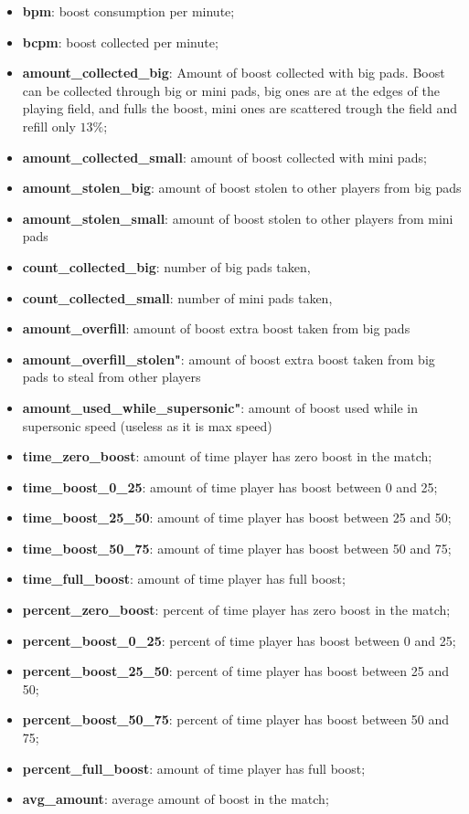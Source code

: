 \begin{itemize}
    \item \textbf{bpm}: boost consumption per minute;
    \item \textbf{bcpm}: boost collected per minute;
    \item \textbf{amount\_collected\_big}: Amount of boost collected with big pads. Boost can be collected through big or mini pads, big ones are at the edges of the playing field, and fulls the boost, mini ones are scattered trough the field and refill only $13 \%$;
    \item \textbf{amount\_collected\_small}: amount of boost collected with mini pads;
    \item \textbf{amount\_stolen\_big}: amount of boost stolen to other players from big pads
    \item \textbf{amount\_stolen\_small}: amount of boost stolen to other players from mini pads
    \item \textbf{count\_collected\_big}: number of big pads taken,
    \item \textbf{count\_collected\_small}: number of mini pads taken,
    \item \textbf{amount\_overfill}: amount of boost extra boost taken from big pads
    \item \textbf{amount\_overfill\_stolen"}: amount of boost extra boost taken from big pads to steal from other players
    \item \textbf{amount\_used\_while\_supersonic"}: amount of boost used while in supersonic speed (useless as it is max speed)
    \item \textbf{time\_zero\_boost}: amount of time player has zero boost in the match;
    \item \textbf{time\_boost\_0\_25}: amount of time player has boost between 0 and 25;
    \item \textbf{time\_boost\_25\_50}: amount of time player has boost between 25 and 50;
    \item \textbf{time\_boost\_50\_75}: amount of time player has boost between 50 and 75;
    \item \textbf{time\_full\_boost}: amount of time player has full boost;
    \item \textbf{percent\_zero\_boost}: percent of time player has zero boost in the match;
    \item \textbf{percent\_boost\_0\_25}: percent of time player has boost between 0 and 25;
    \item \textbf{percent\_boost\_25\_50}: percent of time player has boost between 25 and 50;
    \item \textbf{percent\_boost\_50\_75}: percent of time player has boost between 50 and 75;
    \item \textbf{percent\_full\_boost}: amount of time player has full boost;
    \item \textbf{avg\_amount}: average amount of boost in the match;
\end{itemize}
